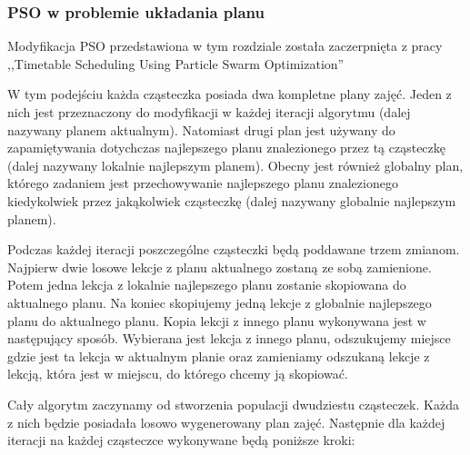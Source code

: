 \subsubsection{PSO w problemie układania planu}
\par Modyfikacja PSO przedstawiona w tym rozdziale została zaczerpnięta z pracy ,,Timetable Scheduling Using Particle Swarm Optimization'' \cite{pso}
\par W tym podejściu każda cząsteczka posiada dwa kompletne plany zajęć. Jeden z nich jest przeznaczony do modyfikacji w każdej iteracji algorytmu (dalej nazywany planem aktualnym). Natomiast drugi plan jest używany do zapamiętywania dotychczas najlepszego planu znalezionego przez tą cząsteczkę (dalej nazywany lokalnie najlepszym planem). Obecny jest również globalny plan, którego zadaniem jest przechowywanie najlepszego planu znalezionego kiedykolwiek przez jakąkolwiek cząsteczkę (dalej nazywany globalnie najlepszym planem).  
\par Podczas każdej iteracji poszczególne cząsteczki będą poddawane trzem zmianom. Najpierw dwie losowe lekcje z planu aktualnego zostaną ze sobą zamienione. Potem jedna lekcja z lokalnie najlepszego planu zostanie skopiowana do aktualnego planu. Na koniec skopiujemy jedną lekcje z globalnie najlepszego planu do aktualnego planu. Kopia lekcji z innego planu wykonywana jest w następujący sposób. Wybierana jest lekcja z innego planu, odszukujemy miejsce gdzie jest ta lekcja w aktualnym planie oraz zamieniamy odszukaną lekcje z lekcją, która jest w miejscu, do którego chcemy ją skopiować. 
\par Cały algorytm zaczynamy od stworzenia populacji dwudziestu cząsteczek. Każda z nich będzie posiadała losowo wygenerowany plan zajęć. Następnie dla każdej iteracji na każdej cząsteczce wykonywane będą poniższe kroki:
